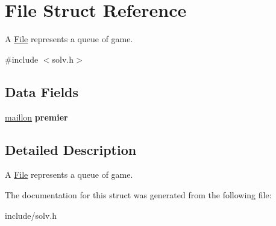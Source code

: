 \hypertarget{struct_file}{}\section{File Struct Reference}
\label{struct_file}


A \hyperlink{struct_file}{File} represents a queue of game.  




{\ttfamily \#include $<$solv.\+h$>$}

\subsection*{Data Fields}
\begin{DoxyCompactItemize}
\item 
\hyperlink{struct_maillon}{maillon} {\bfseries premier}\hypertarget{struct_file_a4755a6ff7bd7c376080e1a0b97d846d0}{}\label{struct_file_a4755a6ff7bd7c376080e1a0b97d846d0}

\end{DoxyCompactItemize}


\subsection{Detailed Description}
A \hyperlink{struct_file}{File} represents a queue of game. 

The documentation for this struct was generated from the following file\+:\begin{DoxyCompactItemize}
\item 
include/solv.\+h\end{DoxyCompactItemize}
